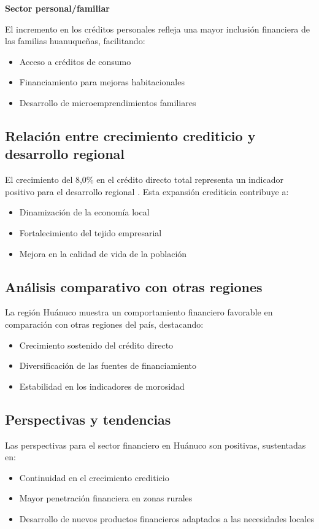 \documentclass[12pt, a4paper]{article}
\begin{document}
\textbf{Sector personal/familiar}

El incremento en los créditos personales refleja una mayor inclusión financiera de las familias huanuqueñas, facilitando:
\begin{itemize}
    \item Acceso a créditos de consumo
    \item Financiamiento para mejoras habitacionales
    \item Desarrollo de microemprendimientos familiares
\end{itemize}

\subsection{Relación entre crecimiento crediticio y desarrollo regional}
El crecimiento del 8,0\% en el crédito directo total representa un indicador positivo para el desarrollo regional \textcite{INEI2024}. Esta expansión crediticia contribuye a:
\begin{itemize}
    \item Dinamización de la economía local
    \item Fortalecimiento del tejido empresarial
    \item Mejora en la calidad de vida de la población
\end{itemize}

\subsection{Análisis comparativo con otras regiones}
La región Huánuco muestra un comportamiento financiero favorable en comparación con otras regiones del país, destacando:
\begin{itemize}
    \item Crecimiento sostenido del crédito directo
    \item Diversificación de las fuentes de financiamiento
    \item Estabilidad en los indicadores de morosidad
\end{itemize}

\subsection{Perspectivas y tendencias}
Las perspectivas para el sector financiero en Huánuco son positivas, sustentadas en:
\begin{itemize}
    \item Continuidad en el crecimiento crediticio
    \item Mayor penetración financiera en zonas rurales
    \item Desarrollo de nuevos productos financieros adaptados a las necesidades locales
\end{itemize}
\end{document}
